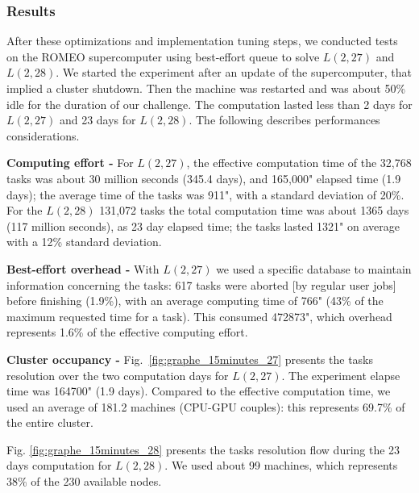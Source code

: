 \subsubsection{Results}
After these optimizations and implementation tuning steps, we conducted tests on the ROMEO supercomputer using best-effort queue to solve $L(2,27)$ and $L(2,28)$. 
We started the experiment after an update of the supercomputer, that implied a cluster shutdown. 
Then the machine was restarted and was about 50\% idle for the duration of our challenge. 
The computation lasted less than 2 days for $L(2,27)$ and 23 days for $L(2,28)$. 
The following describes performances considerations.

\textbf{Computing effort -} 
For $L(2,27)$, the effective computation time of the 32,768 tasks was about 30 million seconds (345.4 days), and 165,000" elapsed time (1.9 days); the average time of the tasks was 911", with a standard deviation of 20\%.
For the $L(2,28)$ 131,072 tasks the total computation time was about 1365 days (117 million seconds), as 23 day elapsed time; the tasks lasted 1321" on average with a 12\% standard deviation.

\textbf{Best-effort overhead -} 
With $L(2,27)$ we used a specific database to maintain information concerning the tasks: 617 tasks were aborted [by regular user jobs] before finishing (1.9\%), with an average computing time of 766" (43\% of the maximum requested time for a task). This consumed 472873", which overhead represents 1.6\% of the effective computing effort.

\textbf{Cluster occupancy -}
Fig.~\ref{fig:graphe_15minutes_27} presents the tasks resolution over the two computation days for $L(2,27)$.
The experiment elapse time was 164700" (1.9 days). Compared to the effective computation time, we used an average of 181.2 machines (CPU-GPU couples): this represents 69.7\% of the entire cluster.
 
Fig. \ref{fig:graphe_15minutes_28} presents the tasks resolution flow during the 23 days computation for $L(2,28)$. We used about 99 machines, which represents 38\% of the 230 available nodes.

